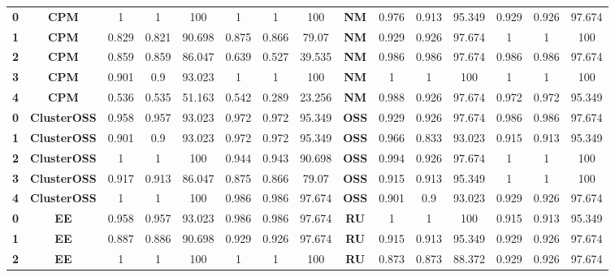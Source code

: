 {{\begin{tabular}{c|c|cccccc|ccccccc}
\textbf{0} & \textbf{CPM} & 1     & 1     & 100   & 1     & 1     & 100   & \multicolumn{1}{c|}{\textbf{NM}} & 0.976 & 0.913 & 95.349 & 0.929 & 0.926 & 97.674 \\
\textbf{1} & \textbf{CPM} & 0.829 & 0.821 & 90.698 & 0.875 & 0.866 & 79.07 & \multicolumn{1}{c|}{\textbf{NM}} & 0.929 & 0.926 & 97.674 & 1     & 1     & 100 \\
\textbf{2} & \textbf{CPM} & 0.859 & 0.859 & 86.047 & 0.639 & 0.527 & 39.535 & \multicolumn{1}{c|}{\textbf{NM}} & 0.986 & 0.986 & 97.674 & 0.986 & 0.986 & 97.674 \\
\textbf{3} & \textbf{CPM} & 0.901 & 0.9   & 93.023 & 1     & 1     & 100   & \multicolumn{1}{c|}{\textbf{NM}} & 1     & 1     & 100   & 1     & 1     & 100 \\
\textbf{4} & \textbf{CPM} & 0.536 & 0.535 & 51.163 & 0.542 & 0.289 & 23.256 & \multicolumn{1}{c|}{\textbf{NM}} & 0.988 & 0.926 & 97.674 & 0.972 & 0.972 & 95.349 \\
\textbf{0} & \textbf{ClusterOSS} & 0.958 & 0.957 & 93.023 & 0.972 & 0.972 & 95.349 & \multicolumn{1}{c|}{\textbf{OSS}} & 0.929 & 0.926 & 97.674 & 0.986 & 0.986 & 97.674 \\
\textbf{1} & \textbf{ClusterOSS} & 0.901 & 0.9   & 93.023 & 0.972 & 0.972 & 95.349 & \multicolumn{1}{c|}{\textbf{OSS}} & 0.966 & 0.833 & 93.023 & 0.915 & 0.913 & 95.349 \\
\textbf{2} & \textbf{ClusterOSS} & 1     & 1     & 100   & 0.944 & 0.943 & 90.698 & \multicolumn{1}{c|}{\textbf{OSS}} & 0.994 & 0.926 & 97.674 & 1     & 1     & 100 \\
\textbf{3} & \textbf{ClusterOSS} & 0.917 & 0.913 & 86.047 & 0.875 & 0.866 & 79.07 & \multicolumn{1}{c|}{\textbf{OSS}} & 0.915 & 0.913 & 95.349 & 1     & 1     & 100 \\
\textbf{4} & \textbf{ClusterOSS} & 1     & 1     & 100   & 0.986 & 0.986 & 97.674 & \multicolumn{1}{c|}{\textbf{OSS}} & 0.901 & 0.9   & 93.023 & 0.929 & 0.926 & 97.674 \\
\textbf{0} & \textbf{EE} & 0.958 & 0.957 & 93.023 & 0.986 & 0.986 & 97.674 & \multicolumn{1}{c|}{\textbf{RU}} & 1     & 1     & 100   & 0.915 & 0.913 & 95.349 \\
\textbf{1} & \textbf{EE} & 0.887 & 0.886 & 90.698 & 0.929 & 0.926 & 97.674 & \multicolumn{1}{c|}{\textbf{RU}} & 0.915 & 0.913 & 95.349 & 0.929 & 0.926 & 97.674 \\
\textbf{2} & \textbf{EE} & 1     & 1     & 100   & 1     & 1     & 100   & \multicolumn{1}{c|}{\textbf{RU}} & 0.873 & 0.873 & 88.372 & 0.929 & 0.926 & 97.674 \\

\end{tabular}}}
